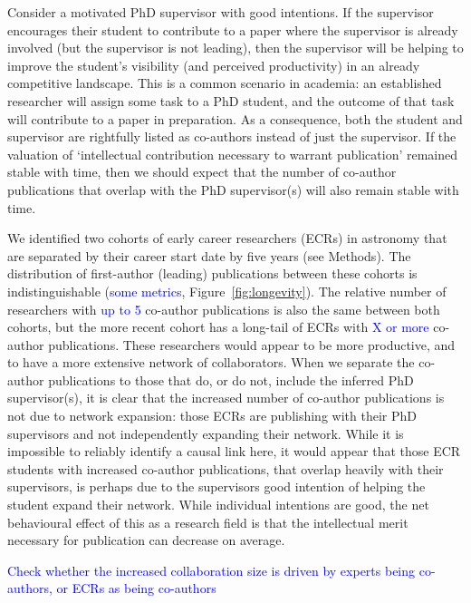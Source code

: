 \documentclass{nature}
\newcommand{\todo}[1]{\textcolor{blue}{#1}}
\begin{document}
Consider a motivated PhD supervisor with good intentions. If the supervisor encourages their student to contribute to a paper where the supervisor is already involved (but the supervisor is not leading), then the supervisor will be helping to improve the student's visibility (and perceived productivity) in an already competitive landscape. This is a common scenario in academia: an established researcher will assign some task to a PhD student, and the outcome of that task will contribute to a paper in preparation. As a consequence, both the student and supervisor are rightfully listed as co-authors instead of just the supervisor. If the valuation of `intellectual contribution necessary to warrant publication' remained stable with time, then we should expect that the number of co-author publications that overlap with the PhD supervisor(s) will also remain stable with time.

We identified two cohorts of early career researchers (ECRs) in astronomy that are separated by their career start date by five years (see Methods). The distribution of first-author (leading) publications between these cohorts is indistinguishable (\todo{some metrics}, Figure~\ref{fig:longevity}). The relative number of researchers with \todo{up to 5} co-author publications is also the same between both cohorts, but the more recent cohort has a long-tail of ECRs with \todo{X or more} co-author publications. These researchers would appear to be more productive, and to have a more extensive network of collaborators. When we separate the co-author publications to those that do, or do not, include the inferred PhD supervisor(s), it is clear that the increased number of co-author publications is not due to network expansion: those ECRs are publishing with their PhD supervisors and not independently expanding their network. While it is impossible to reliably identify a causal link here, it would appear that those ECR students with increased co-author publications, that overlap heavily with their supervisors, is perhaps due to the supervisors good intention of helping the student expand their network. While individual intentions are good, the net behavioural effect of this as a research field is that the intellectual merit necessary for publication can decrease on average. 

\todo{Check whether the increased collaboration size is driven by experts being co-authors, or ECRs as being co-authors}
\end{document}
